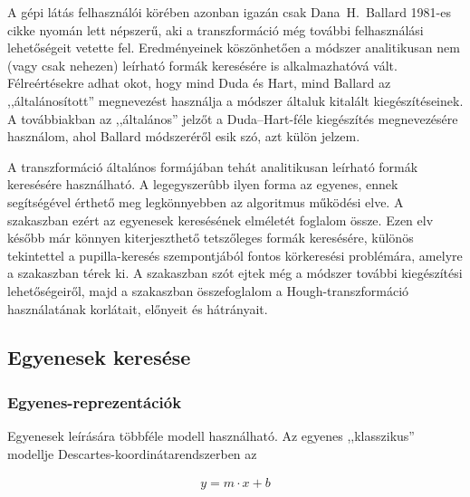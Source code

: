 A gépi látás felhasználói körében azonban igazán csak Dana~H.~Ballard 1981-es cikke \cite{hough_ballard} nyomán lett népszerű, aki a transzformáció még további felhasználási lehetőségeit vetette fel. Eredményeinek köszönhetően a módszer analitikusan nem (vagy csak nehezen) leírható formák keresésére is alkalmazhatóvá vált. Félreértésekre adhat okot, hogy mind Duda és Hart, mind Ballard az ,,általánosított'' megnevezést használja a módszer általuk kitalált kiegészítéseinek. A továbbiakban az ,,általános'' jelzőt a Duda--Hart-féle kiegészítés megnevezésére használom, ahol Ballard módszeréről esik szó, azt külön jelzem.

\bigskip

A transzformáció általános formájában tehát analitikusan leírható formák keresésére használható. A legegyszerûbb ilyen forma az egyenes, ennek segítségével érthető meg legkönnyebben az algoritmus működési elve. A  szakaszban ezért az egyenesek keresésének elméletét foglalom össze. Ezen elv később már könnyen kiterjeszthető tetszőleges formák keresésére, különös tekintettel a pupilla-keresés szempontjából fontos körkeresési problémára, amelyre a  szakaszban térek ki. A  szakaszban szót ejtek még a módszer további kiegészítési lehetőségeiről, majd a  szakaszban összefoglalom a Hough-transzformáció használatának korlátait, előnyeit és hátrányait.


\subsection{Egyenesek keresése}\label{sect:egyenesek_keresese}

\subsubsection{Egyenes-reprezentációk}\label{sect:egyenes_reprezentaciok}

Egyenesek leírására többféle modell használható. Az egyenes ,,klasszikus'' modellje Descartes-koordinátarendszerben az

\begin{align}\label{eq:egyenes_klasszikus}
y = m \cdot x + b
\end{align}

